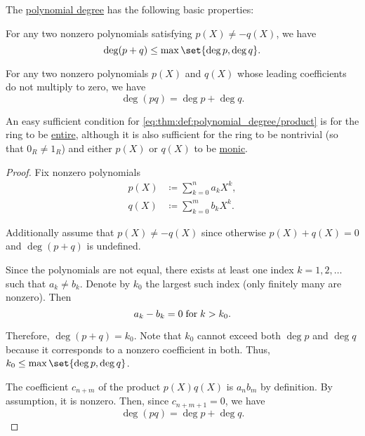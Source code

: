 \begin{proposition}\label{thm:def:polynomial_degree}
  The \hyperref[def:polynomial_degree]{polynomial degree} has the following basic properties:
  \begin{thmenum}
     For any two nonzero polynomials satisfying \( p(X) \neq -q(X) \), we have
    \begin{equation}\label{eq:thm:def:polynomial_degree/sum}
      \deg (p + q) \leq \max \set{ \deg p, \deg q }.
    \end{equation}

     For any two nonzero polynomials \( p(X) \) and \( q(X) \) whose leading coefficients do not multiply to zero, we have
    \begin{equation}\label{eq:thm:def:polynomial_degree/product}
      \deg (pq) = \deg p + \deg q.
    \end{equation}
  \end{thmenum}
\end{proposition}
\begin{comments}
  \item An easy sufficient condition for \eqref{eq:thm:def:polynomial_degree/product} is for the ring to be \hyperref[def:entire_semiring]{entire}, although it is also sufficient for the ring to be nontrivial (so that \( 0_R \neq 1_R \)) and either \( p(X) \) or \( q(X) \) to be \hyperref[def:monic_polynomial]{monic}.
\end{comments}
\begin{proof}
  Fix nonzero polynomials
  \begin{align*}
    p(X) &\coloneqq \sum_{k=0}^n a_k X^k, \\
    q(X) &\coloneqq \sum_{k=0}^m b_k X^k.
  \end{align*}

   Additionally assume that \( p(X) \neq -q(X) \) since otherwise \( p(X) + q(X) = 0 \) and \( \deg(p + q) \) is undefined.

  Since the polynomials are not equal, there exists at least one index \( k = 1, 2, \ldots \) such that \( a_k \neq b_k \). Denote by \( k_0 \) the largest such index (only finitely many are nonzero). Then
  \begin{equation*}
    a_k - b_k = 0 \T{for} k > k_0.
  \end{equation*}

  Therefore, \( \deg(p + q) = k_0 \). Note that \( k_0 \) cannot exceed both \( \deg p \) and \( \deg q \) because it corresponds to a nonzero coefficient in both. Thus, \( k_0 \leq \max\set{ \deg p, \deg q } \).

   The coefficient \( c_{n + m} \) of the product \( p(X) q(X) \) is \( a_n b_m \) by definition. By assumption, it is nonzero. Then, since \( c_{n+m+1} = 0 \), we have
  \begin{equation*}
    \deg (pq) = \deg p + \deg q.
  \end{equation*}
\end{proof}

